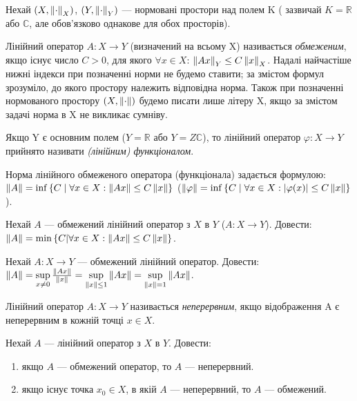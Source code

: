 
\begin{theory}
    Нехай $(X, \left\lVert\cdot\right\rVert_X)$, $(Y, \left\lVert\cdot\right\rVert_Y)$ --- нормовані простори над полем K (
        зазвичай $K = 
    \mathbb{R}$ або $\mathbb{C}$, 
    але обов'язково однакове для обох просторів). 

    Лінійний оператор $A: X \rightarrow Y$ (визначений на всьому X) називається 
    \emph{обмеженим}, якщо існує число $C > 0$, для якого $\forall x \in X$: 
    $\left\lVert Ax\right\rVert_Y \leq C \left\lVert x\right\rVert_X$. Надалі найчастіше нижні індекси при позначенні норми 
    не будемо ставити; за змістом формул зрозуміло, до якого простору належить відповідна 
    норма. Також при позначенні нормованого простору $(X, \left\lVert\cdot\right\rVert)$ будемо писати лише 
    літеру X, якщо за змістом задачі норма в X не викликає сумніву. 

    Якщо Y є основним полем ($Y=\mathbb{R}$ або $Y =Z \mathbb{C}$), то лінійний оператор 
    $\varphi: X \rightarrow Y$ прийнято називати \emph{(лінійним) функціоналом}.

    Норма лінійного обмеженого оператора (функціонала) задається формулою: 
    $\left\lVert A\right\rVert = \inf\left\{C\;|\;\forall x \in X : \left\lVert Ax\right\rVert\leq C\left\lVert x\right\rVert \right\}$
    ($\left\lVert\varphi\right\rVert = \inf\left\{C \;|\; \forall x \in X : |\varphi(x)|\leq C\left\lVert x\right\rVert \right\}$).
\end{theory}

\begin{exercise}
    Нехай $A$ --- обмежений лінійний оператор з $X$ в $Y$ ($A: X \rightarrow Y$).
    Довести: $\left\lVert A\right\rVert = \min\left\{C|\forall x \in X : \left\lVert Ax\right\rVert \leq C\left\lVert x\right\rVert\right\}$.
\end{exercise}

\begin{exercise}
    Нехай $A: X \rightarrow Y$ --- обмежений лінійний оператор.
    Довести: $\left\lVert A\right\rVert = \sup\limits_{x \neq 0}\frac{\left\lVert Ax\right\rVert}{\left\lVert x\right\rVert} = 
    \sup\limits_{\left\lVert x\right\rVert \leq 1}\left\lVert Ax\right\rVert = \sup\limits_{\left\lVert x\right\rVert = 1}\left\lVert Ax\right\rVert$.
\end{exercise}

\begin{theory}
    Лінійний оператор $A: X \rightarrow Y$ називається \emph{неперервним}, якщо відображення 
    A є неперервним в кожній точці $x \in X$.
\end{theory}

\begin{exercise}
    Нехай $A$ --- лінійний оператор з $X$ в $Y$. Довести: 
    \begin{enumerate}[label=\alph*)]
        \item якщо $A$ --- обмежений оператор, то $A$ --- неперервний.
        \item якщо існує точка $x_0 \in X$, в якій $A$ --- неперервний, то $A$ --- обмежений.
    \end{enumerate}
\end{exercise}

